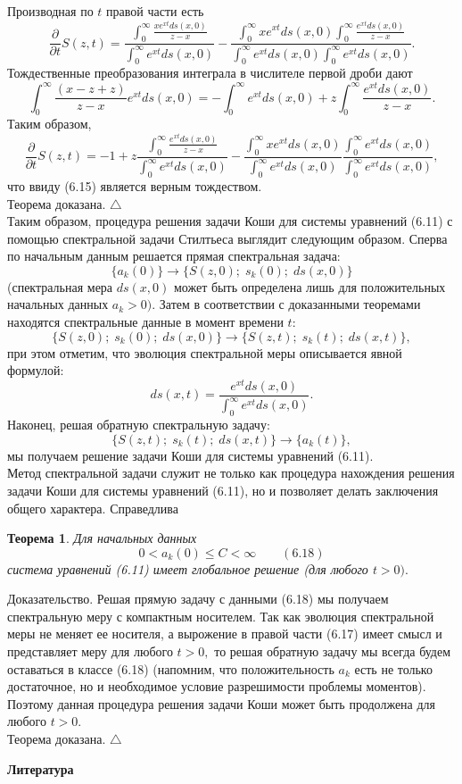 \documentclass[12 pt, a4 paper]{article}
\theoremstyle{plain}   \newtheorem{Pro}{Задача}
\newtheorem{The}{Теорема}
\begin{document}
Производная по
$ t $
правой части есть
$$
  \frac{\partial}{\partial t}S(z,t)=
    \frac{\int _0 ^{\infty}
	  \frac{xe^{xt}ds(x,0)}{z-x}}
	{\int _0 ^{\infty} e^{xt}ds(x,0)}-
  \frac{\int _0 ^{\infty}xe^{xt}ds(x,0)
    \int _0 ^{\infty} \frac{e^{xt}ds(x,0)}{z-x}}
	{\int _0 ^{\infty}e^{xt}ds(x,0)
	  \int _0 ^{\infty}e^{xt}ds(x,0)}.
$$
Тождественные преобразования интеграла в числителе
первой дроби дают
$$
  \int _0 ^{\infty}\frac{(x-z+z)}{z-x}e^{xt}ds(x,0)=-
    \int _0 ^{\infty}e^{xt}ds(x,0)+z
	  \int _0 ^{\infty}\frac{e^{xt}ds(x,0)}{z-x}.
$$
Таким образом,
$$
  \frac{\partial}{\partial t}S(z,t)=-1+z\frac
    {\int _0 ^{\infty}\frac{e^{xt}ds(x,0)}{z-x}}
	{\int _0 ^{\infty} e^{xt}ds(x,0)}-
	  \frac{\int _0 ^{\infty}x e^{xt}ds(x,0)}
	  {\int _0 ^{\infty} e^{xt}ds(x,0)}
	    \frac{\int _0 ^{\infty}e^{xt}ds(x,0)}
		{\int _0 ^{\infty} e^{xt}ds(x,0)} ,
$$
что ввиду (6.15) является верным тождеством. \\
Теорема доказана.
$ \triangle $ \\
Таким образом, процедура решения задачи Коши
для системы уравнений (6.11)
с помощью спектральной задачи Стилтьеса
выглядит следующим образом.
Сперва по начальным данным решается прямая спектральная
задача:
$$
  \{ a_k (0) \} \longrightarrow
    \{ S(z,0); \; s_k (0); \; ds(x,0) \}
$$
(спектральная мера
$ ds(x,0) $
может быть определена лишь для положительных начальных данных
$ a_k >0 ). $
Затем в соответствии с доказанными теоремами находятся
спектральные данные в момент времени
$ t : $
$$
  \{ S(z,0); \; s_k (0); \; ds(x,0) \}
    \longrightarrow
	  \{ S(z,t); \; s_k (t); \; ds(x,t) \} ,
$$
при этом отметим, что эволюция спектральной меры описывается
явной формулой:
$$
  ds(x,t)=\frac{e^{xt}ds(x,0)}
    {\int _0 ^{\infty} e^{xt} ds(x,0)}.
$$
Наконец, решая обратную спектральную задачу:
$$
  \{ S(z,t); \; s_k (t); \; ds(x,t) \}
    \longrightarrow
	  \{ a_k (t) \} ,
$$
мы получаем решение задачи Коши для системы уравнений (6.11). \\
Метод спектральной задачи служит не только как процедура нахождения
решения задачи Коши для системы уравнений (6.11), но и позволяет
делать заключения общего характера. Справедлива
\begin{The}
Для начальных данных
$$
  0<a_k (0) \leqslant C < \infty
    \qquad (6.18)
$$
система уравнений (6.11) имеет глобальное решение
(для любого
$ t>0 ). $
\end{The}
{\Large Доказательство.}
Решая прямую задачу с данными (6.18) мы получаем спектральную меру
с компактным носителем. Так как эволюция спектральной меры
не меняет ее носителя, а вырожение в правой части (6.17)
имеет смысл и представляет меру для любого
$ t>0 , $
то решая обратную задачу мы всегда будем оставаться в классе
(6.18) (напомним, что положительность
$ a_k $
есть не только достаточное, но и необходимое условие
разрешимости проблемы моментов). Поэтому данная процедура
решения задачи Коши может быть продолжена для любого
$ t>0 . $ \\
Теорема доказана.
$ \triangle $
\newpage
\begin{center}
{\bfseries Литература}
\end{center}
$$ \; $$
\\
\end{document}
